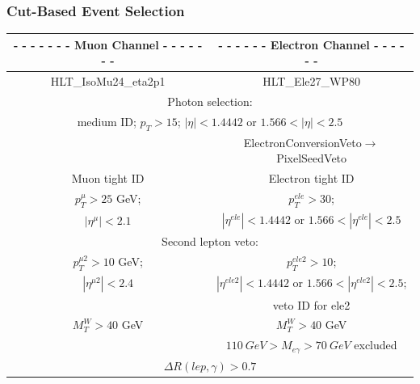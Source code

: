 \begin{frame}\frametitle{Cut-Based Event Selection}
\begin{table}[h]
\scriptsize
\begin{center}
\begin{tabular}{|c|c|}
{\footnotesize\bfseries{- - - - - - - Muon Channel - - - - - - -}} & 
{\footnotesize\bfseries{- - - - - - Electron Channel - - - - - -}}\\ \hline
 {\scriptsize{HLT\_IsoMu24\_eta2p1}} &  {\scriptsize{HLT\_Ele27\_WP80}}  \\ \hline
 \multicolumn{2}{|c|}{Photon selection:}\\
 \multicolumn{2}{|c|}{\tiny{medium ID; $p_T>15$; $|\eta| < 1.4442$ or $1.566 < |\eta| < 2.5$}}\\ 
               &{\tiny{ ElectronConversionVeto$\rightarrow$PixelSeedVeto}} \\ \hline
 Muon tight ID & Electron tight ID \\ \hline
 \tiny{$p_T^{\mu}>25$ GeV;} &  \tiny{$p_T^{ele}>30$;}  \\ 
 \tiny{$|\eta^{\mu}|<2.1$} & \tiny{$|\eta^{ele}| < 1.4442$ or $1.566 < |\eta^{ele}| < 2.5$} \\ \hline
 \multicolumn{2}{|c|}{Second lepton veto:}\\
 \tiny{$p_T^{\mu2}>10$ GeV;} &  \tiny{$p_T^{ele2}>10$;} \\
 \tiny{$|\eta^{\mu2}|<2.4$}  &   \tiny{$|\eta^{ele2}| < 1.4442$ or $1.566 < |\eta^{ele2}| < 2.5$;} \\
  &   \tiny{veto ID for ele2} \\ \hline
 $M_T^W>40$ GeV & $M_T^W>40$ GeV \\ \hline
  & $110~GeV>M_{e\gamma}>70~GeV$ excluded \\ \hline
 \multicolumn{2}{|c|}{$\Delta{R}(lep,\gamma)>0.7$}\\  \hline
\end{tabular}
\end{center}
\end{table}

\end{frame}%

